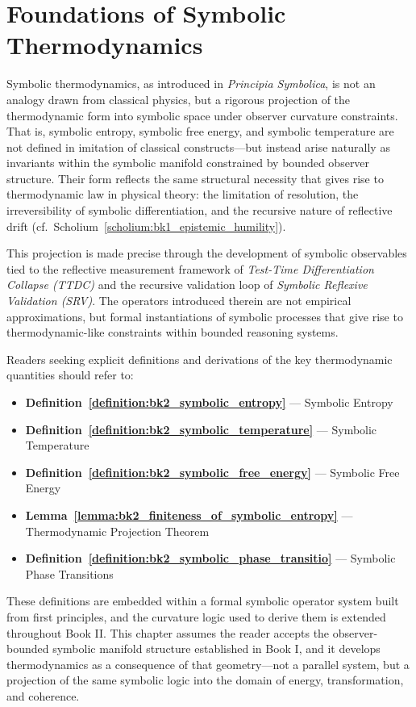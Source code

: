 
\section{Foundations of Symbolic Thermodynamics} 
\label{sec:bk2_foundations_symbolic_thermodynamics}

Symbolic thermodynamics, as introduced in \emph{Principia Symbolica}, is not an analogy drawn from classical physics, but a rigorous projection of the thermodynamic form into symbolic space under observer curvature constraints. That is, symbolic entropy, symbolic free energy, and symbolic temperature are not defined in imitation of classical constructs—but instead arise naturally as invariants within the symbolic manifold constrained by bounded observer structure. Their form reflects the same structural necessity that gives rise to thermodynamic law in physical theory: the limitation of resolution, the irreversibility of symbolic differentiation, and the recursive nature of reflective drift (cf.~Scholium~\ref{scholium:bk1_epistemic_humility}).

This projection is made precise through the development of symbolic observables tied to the reflective measurement framework of \textit{Test-Time Differentiation Collapse (TTDC)} and the recursive validation loop of \textit{Symbolic Reflexive Validation (SRV)}. The operators introduced therein are not empirical approximations, but formal instantiations of symbolic processes that give rise to thermodynamic-like constraints within bounded reasoning systems.

Readers seeking explicit definitions and derivations of the key thermodynamic quantities should refer to:

\begin{itemize} \item \textbf{Definition~\ref{definition:bk2_symbolic_entropy}} — Symbolic Entropy \item \textbf{Definition~\ref{definition:bk2_symbolic_temperature}} — Symbolic Temperature \item \textbf{Definition~\ref{definition:bk2_symbolic_free_energy}} — Symbolic Free Energy \item
\textbf{Lemma~\ref{lemma:bk2_finiteness_of_symbolic_entropy}} — Thermodynamic Projection Theorem \item \textbf{Definition~\ref{definition:bk2_symbolic_phase_transitio}} — Symbolic Phase Transitions \end{itemize}

These definitions are embedded within a formal symbolic operator system built from first principles, and the curvature logic used to derive them is extended throughout Book II. This chapter assumes the reader accepts the observer-bounded symbolic manifold structure established in Book I, and it develops thermodynamics as a consequence of that geometry—not a parallel system, but a projection of the same symbolic logic into the domain of energy, transformation, and coherence.

